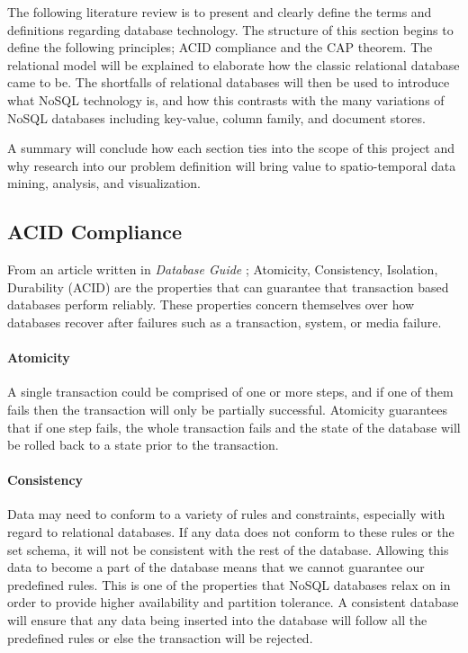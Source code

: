The following literature review is to present and clearly define the terms and definitions regarding database technology. The structure of this section begins to define the following principles; ACID compliance and the CAP theorem. The relational model will be explained to elaborate how the classic relational database came to be. The shortfalls of relational databases will then be used to introduce what NoSQL technology is, and how this contrasts with the many variations of NoSQL databases including key-value, column family, and document stores.

A summary will conclude how each section ties into the scope of this project and why research into our problem definition will bring value to spatio-temporal data mining, analysis, and visualization.

\subsection{ACID Compliance}
\label{sec:acid}

From an article written in \emph{Database Guide} \cite{acid}; Atomicity, Consistency, Isolation, Durability (ACID) are the properties that can guarantee that transaction based databases perform reliably. These properties concern themselves over how databases recover after failures such as a transaction, system, or media failure.

\paragraph{Atomicity}
A single transaction could be comprised of one or more steps, and if one of them fails then the transaction will only be partially successful. Atomicity guarantees that if one step fails, the whole transaction fails and the state of the database will be rolled back to a state prior to the transaction.

\paragraph{Consistency}
Data may need to conform to a variety of rules and constraints, especially with regard to relational databases. If any data does not conform to these rules or the set schema, it will not be consistent with the rest of the database. Allowing this data to become a part of the database means that we cannot guarantee our predefined rules. This is one of the properties that NoSQL databases relax on in order to provide higher availability and partition tolerance. A consistent database will ensure that any data being inserted into the database will follow all the predefined rules or else the transaction will be rejected.

